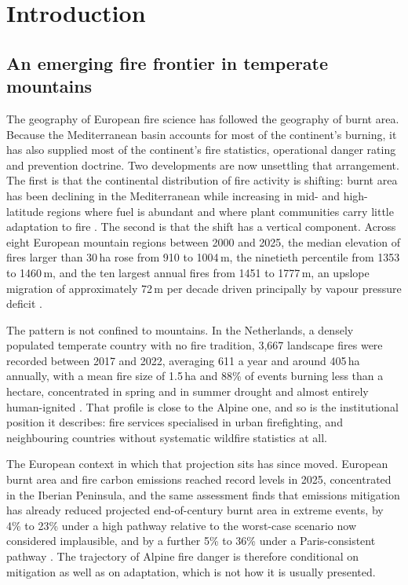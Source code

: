 \documentclass[11pt,a4paper]{article}
\begin{document}
\section{Introduction}
\label{sec:intro}

\subsection{An emerging fire frontier in temperate mountains}

The geography of European fire science has followed the geography of burnt area. Because the Mediterranean basin accounts for most of the continent's burning, it has also supplied most of the continent's fire statistics, operational danger rating and prevention doctrine. Two developments are now unsettling that arrangement. The first is that the continental distribution of fire activity is shifting: burnt area has been declining in the Mediterranean while increasing in mid- and high-latitude regions where fuel is abundant and where plant communities carry little adaptation to fire \citep{miller_compounding_2025}. The second is that the shift has a vertical component. Across eight European mountain regions between 2000 and 2025, the median elevation of fires larger than 30\,ha rose from 910 to 1004\,m, the ninetieth percentile from 1353 to 1460\,m, and the ten largest annual fires from 1451 to 1777\,m, an upslope migration of approximately 72\,m per decade driven principally by vapour pressure deficit \citep{beloiu_climatedriven_2026}.

The pattern is not confined to mountains. In the Netherlands, a densely populated temperate country with no fire tradition, 3{,}667 landscape fires were recorded between 2017 and 2022, averaging 611 a year and around 405\,ha annually, with a mean fire size of 1.5\,ha and 88\% of events burning less than a hectare, concentrated in spring and in summer drought and almost entirely human-ignited \citep{stoof_temperate_2024}. That profile is close to the Alpine one, and so is the institutional position it describes: fire services specialised in urban firefighting, and neighbouring countries without systematic wildfire statistics at all.

The European context in which that projection sits has since moved. European burnt area and fire carbon emissions reached record levels in 2025, concentrated in the Iberian Peninsula, and the same assessment finds that emissions mitigation has already reduced projected end-of-century burnt area in extreme events, by 4\% to 23\% under a high pathway relative to the worst-case scenario now considered implausible, and by a further 5\% to 36\% under a Paris-consistent pathway \citep{burton_state_2026}. The trajectory of Alpine fire danger is therefore conditional on mitigation as well as on adaptation, which is not how it is usually presented.
\end{document}
